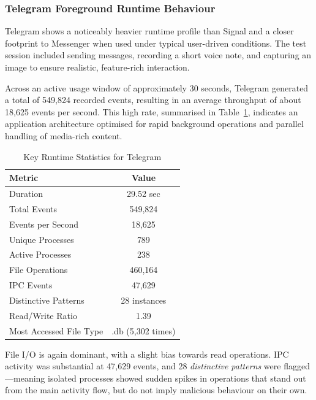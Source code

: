 \documentclass[a4paper,12pt]{report}
\begin{document}
\subsubsection{Telegram Foreground Runtime Behaviour}

Telegram shows a noticeably heavier runtime profile than Signal and a closer footprint to Messenger when used under typical user-driven conditions. The test session included sending messages, recording a short voice note, and capturing an image to ensure realistic, feature-rich interaction.

Across an active usage window of approximately 30 seconds, Telegram generated a total of 549,824 recorded events, resulting in an average throughput of about 18,625 events per second. This high rate, summarised in Table~\ref{tab:telegram_key_stats}, indicates an application architecture optimised for rapid background operations and parallel handling of media-rich content.

\begin{table}[H]
    \centering
    \caption{Key Runtime Statistics for Telegram}
    \label{tab:telegram_key_stats}
    \begin{tabular}{|l|c|}
        \hline
        \textbf{Metric} & \textbf{Value} \\
        \hline
        Duration & 29.52 sec \\
        Total Events & 549,824 \\
        Events per Second & 18,625 \\
        Unique Processes & 789 \\
        Active Processes & 238 \\
        File Operations & 460,164 \\
        IPC Events & 47,629 \\
        Distinctive Patterns & 28 instances \\
        Read/Write Ratio & 1.39 \\
        Most Accessed File Type & .db (5,302 times) \\
        \hline
    \end{tabular}
\end{table}

File I/O is again dominant, with a slight bias towards read operations. IPC activity was substantial at 47,629 events, and 28 \textit{distinctive patterns} were flagged—meaning isolated processes showed sudden spikes in operations that stand out from the main activity flow, but do not imply malicious behaviour on their own.
\end{document}
